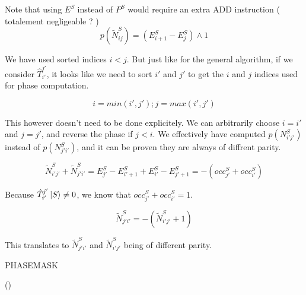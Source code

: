 \documentclass[./thesis.tex]{subfiles}
\begin{document}
Note that using $E^S$ instead of $P^S$ would require an extra ADD instruction ( totalement negligeable ? )
$$p(\tilde N^S_{ij}) = (E^S_{i+1} - E^S_j) \wedge 1$$

We have used sorted indices $i<j$. But just like for the general algorithm, if we consider $\hat T_{i'}^{j'}$, it looks like we need to sort $i'$ and $j'$ to get the $i$ and $j$ indices used for phase computation.

$$i=min(i', j') ; j=max(i', j')$$

This however doesn't need to be done explicitely. We can arbitrarily choose $i=i'$ and $j=j'$, and reverse the phase if $j<i$. We effectively have computed $p(N^S_{i'j'})$ instead of $p(N^S_{j'i'})$, and it can be proven they are always of diffrent parity.

$$\tilde N^{S}_{i' j'} + \tilde N^{S}_{j'i'} = E^{S}_{j'} - E^S_{i'+1} + E^S_{i'} - E^S_{j'+1} = -(occ^S_{j'} + occ^S_{i'})$$

Because $\hat T_{i'}^{j'} \ket S \neq 0$, we know that $occ^S_{j'} + occ^S_{i'} = 1$. 

$$\tilde N^{S}_{j' i'} = -(\tilde N^{S}_{i'j'} + 1)$$

This translates to $\tilde N^{S}_{j' i'}$ and $\tilde N^{S}_{i'j'}$ being of different parity.


\begin{algorithm}
	\caption{PHASEMASK}	
	\label{alg:PHASEMASK}	
	
	\Fn(){}{
		   
		 \;
		}
\end{algorithm}
\end{document}
